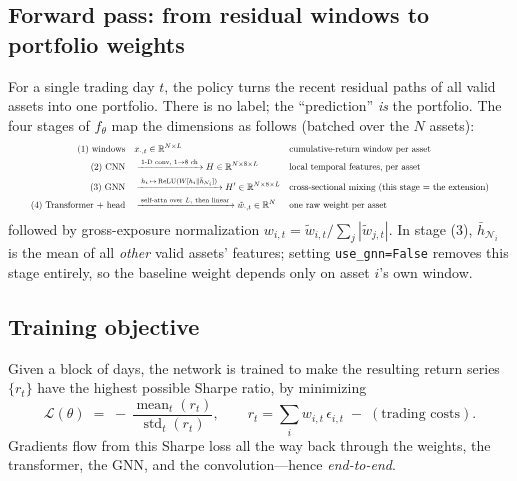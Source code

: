 \documentclass[11pt]{article}
\begin{document}
\subsection{Forward pass: from residual windows to portfolio weights}
For a single trading day $t$, the policy turns the recent residual paths of all valid
assets into one portfolio. There is no label; the ``prediction'' \emph{is} the
portfolio. The four stages of $f_\theta$ map the dimensions as follows
(batched over the $N$ assets):
\[
\resizebox{0.95\textwidth}{!}{$\displaystyle
\begin{aligned}
\text{(1) windows} \quad & x_{\cdot,t} \in \mathbb{R}^{N\times L}
   && \text{cumulative-return window per asset} \\
\text{(2) CNN} \quad & \xrightarrow{\;\text{1-D conv, }1\to8\text{ ch}\;} H \in \mathbb{R}^{N\times 8\times L}
   && \text{local temporal features, per asset} \\
\text{(3) GNN} \quad & \xrightarrow{\;h_i \,\mapsto\, \mathrm{ReLU}(W[h_i \Vert \bar h_{\mathcal N_i}])\;} H' \in \mathbb{R}^{N\times 8\times L}
   && \text{cross-sectional mixing (this stage = the extension)} \\
\text{(4) Transformer + head} \quad & \xrightarrow{\;\text{self-attn over }L,\ \text{then linear}\;} \tilde w_{\cdot,t} \in \mathbb{R}^{N}
   && \text{one raw weight per asset}
\end{aligned}$}
\]
followed by gross-exposure normalization $w_{i,t} = \tilde w_{i,t} / \sum_j |\tilde w_{j,t}|$.
In stage (3), $\bar h_{\mathcal N_i}$ is the mean of all \emph{other} valid assets'
features; setting \texttt{use\_gnn=False} removes this stage entirely, so the baseline
weight depends only on asset $i$'s own window.

\subsection{Training objective}
Given a block of days, the network is trained to make the resulting return series
$\{r_t\}$ have the highest possible Sharpe ratio, by minimizing
\begin{equation}
  \mathcal{L}(\theta) \;=\; -\,\frac{\operatorname{mean}_t(r_t)}{\operatorname{std}_t(r_t)},
  \qquad r_t = \sum_i w_{i,t}\,\epsilon_{i,t} \;-\; (\text{trading costs}).
\end{equation}
Gradients flow from this Sharpe loss all the way back through the weights, the
transformer, the GNN, and the convolution---hence \emph{end-to-end}.
\end{document}

